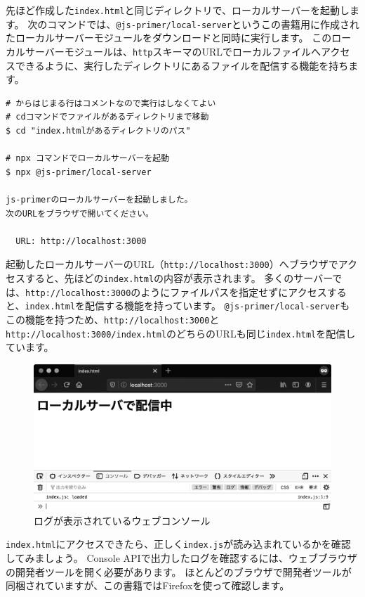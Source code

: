 先ほど作成した\texttt{index.html}と同じディレクトリで、ローカルサーバーを起動します。
次のコマンドでは、\texttt{@js-primer/local-server}というこの書籍用に作成されたローカルサーバーモジュールをダウンロードと同時に実行します。
このローカルサーバーモジュールは、\texttt{http}スキーマのURLでローカルファイルへアクセスできるように、実行したディレクトリにあるファイルを配信する機能を持ちます。

\begin{lstlisting}
# からはじまる行はコメントなので実行はしなくてよい
# cdコマンドでファイルがあるディレクトリまで移動
$ cd "index.htmlがあるディレクトリのパス"

# npx コマンドでローカルサーバーを起動
$ npx @js-primer/local-server

js-primerのローカルサーバーを起動しました。
次のURLをブラウザで開いてください。

  URL: http://localhost:3000
\end{lstlisting}

起動したローカルサーバーのURL（\texttt{http://localhost:3000}）へブラウザでアクセスすると、先ほどの\texttt{index.html}の内容が表示されます。
多くのサーバーでは、\texttt{http://localhost:3000}のようにファイルパスを指定せずにアクセスすると、\texttt{index.html}を配信する機能を持っています。
\texttt{@js-primer/local-server}もこの機能を持つため、\texttt{http://localhost:3000}と\texttt{http://localhost:3000/index.html}のどちらのURLも同じ\texttt{index.html}を配信しています。

\begin{figure}[h]
\centering
\includegraphics[width=120mm]{fig/index.eps}
\caption{ログが表示されているウェブコンソール}
\end{figure}

\texttt{index.html}にアクセスできたら、正しく\texttt{index.js}が読み込まれているかを確認してみましょう。
Console
APIで出力したログを確認するには、ウェブブラウザの開発者ツールを開く必要があります。
ほとんどのブラウザで開発者ツールが同梱されていますが、この書籍ではFirefoxを使って確認します。

